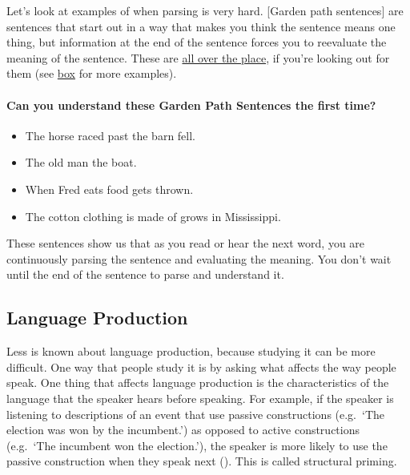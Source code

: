 \documentclass[
]{krantz}
\providecommand{\tightlist}{%
  \setlength{\itemsep}{0pt}\setlength{\parskip}{0pt}}
\begin{document}
Let's look at examples of when parsing is very hard. {[}Garden path sentences{]} are sentences that start out in a way that makes you think the sentence means one thing, but information at the end of the sentence forces you to reevaluate the meaning of the sentence. These are \href{https://www.theguardian.com/world/2018/apr/10/spanish-politicians-urged-to-resign-over-fake-degree-claims}{all over the place}, if you're looking out for them (see \hyperref[can-you-understand-these-garden-path-sentences-the-first-time]{box} for more examples).

\paragraph*{Can you understand these Garden Path Sentences the first time?}\label{can-you-understand-these-garden-path-sentences-the-first-time}

\begin{itemize}
\tightlist
\item
  The horse raced past the barn fell.
\item
  The old man the boat.
\item
  When Fred eats food gets thrown.
\item
  The cotton clothing is made of grows in Mississippi.
\end{itemize}

These sentences show us that as you read or hear the next word, you are continuously parsing the sentence and evaluating the meaning. You don't wait until the end of the sentence to parse and understand it.

\subsection*{Language Production}\label{language-production}


Less is known about language production, because studying it can be more difficult. One way that people study it is by asking what affects the way people speak. One thing that affects language production is the characteristics of the language that the speaker hears before speaking. For example, if the speaker is listening to descriptions of an event that use passive constructions (e.g.~`The election was won by the incumbent.') as opposed to active constructions (e.g.~`The incumbent won the election.'), the speaker is more likely to use the passive construction when they speak next (). This is called structural priming.
\end{document}

